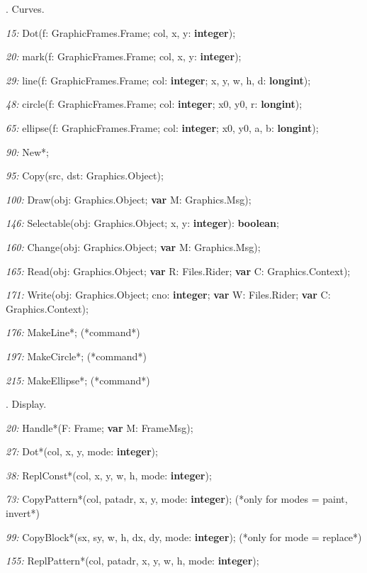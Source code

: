 

\def\INTEGER{{\bf integer}}
\def\LONGINT{{\bf longint}}
\def\BOOLEAN{{\bf boolean}}
\def\REAL{{\bf real}}
\def\BYTE{{\bf byte}}
\def\CHAR{{\bf char}}
\def\SET{{\bf set}}
\def\VAR{{\bf var }}
\def\ARRAYOF{{\bf array of }}
\def\ORB{{\mc ORB}}
\def\ORG{{\mc ORG}}
\def\ORS{{\mc ORS}}
\def\ORP{{\mc ORP}}

. Curves.

\item{\it 15:} Dot(f: GraphicFrames.Frame; col, x, y: \INTEGER);
\item{\it 20:} mark(f: GraphicFrames.Frame; col, x, y: \INTEGER);
\item{\it 29:} line(f: GraphicFrames.Frame; col: \INTEGER; x, y, w, h, d: \LONGINT);
\item{\it 48:} circle(f: GraphicFrames.Frame; col: \INTEGER; x0, y0, r: \LONGINT);
\item{\it 65:} ellipse(f: GraphicFrames.Frame; col: \INTEGER; x0, y0, a, b: \LONGINT);
\item{\it 90:} New*;
\item{\it 95:} Copy(src, dst: Graphics.Object);
\item{\it 100:} Draw(obj: Graphics.Object; \VAR M: Graphics.Msg);
\item{\it 146:} Selectable(obj: Graphics.Object; x, y: \INTEGER): \BOOLEAN;
\item{\it 160:} Change(obj: Graphics.Object; \VAR M: Graphics.Msg);
\item{\it 165:} Read(obj: Graphics.Object; \VAR R: Files.Rider; \VAR C: Graphics.Context);
\item{\it 171:} Write(obj: Graphics.Object; cno: \INTEGER; \VAR W: Files.Rider; \VAR C: Graphics.Context);
\item{\it 176:} MakeLine*;  (*command*)
\item{\it 197:} MakeCircle*;  (*command*)
\item{\it 215:} MakeEllipse*;  (*command*)

. Display.

\item{\it 20:} Handle*(F: Frame; \VAR M: FrameMsg);
\item{\it 27:} Dot*(col, x, y, mode: \INTEGER);
\item{\it 38:} ReplConst*(col, x, y, w, h, mode: \INTEGER);
\item{\it 73:} CopyPattern*(col, patadr, x, y, mode: \INTEGER);  (*only for modes = paint, invert*)
\item{\it 99:} CopyBlock*(sx, sy, w, h, dx, dy, mode: \INTEGER); (*only for mode = replace*)
\item{\it 155:} ReplPattern*(col, patadr, x, y, w, h, mode: \INTEGER);


